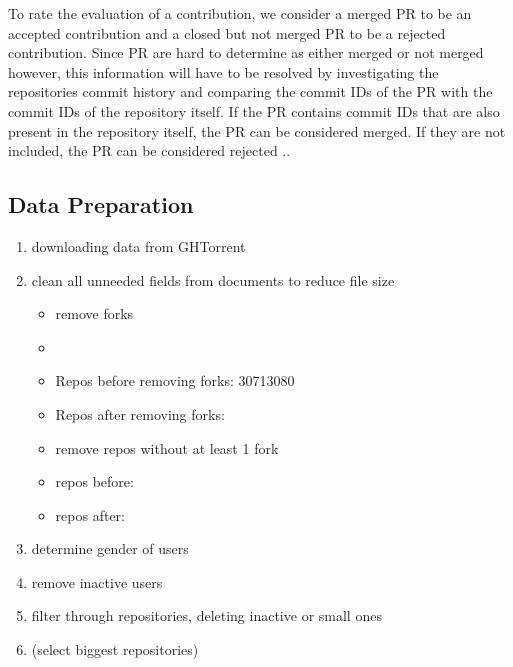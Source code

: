 To rate the evaluation of a contribution, we consider a merged \ac{PR} to be an accepted contribution and a closed but not merged \ac{PR} to be a rejected contribution. Since \ac{PR} are hard to determine as either merged or not merged however, this information will have to be resolved by investigating the repositories commit history and comparing the commit IDs of the \ac{PR} with the commit IDs of the repository itself. If the \ac{PR} contains commit IDs that are also present in the repository itself, the PR can be considered merged. If they are not included, the \ac{PR} can be considered rejected \cite{Vasilescu:2015:GTD:2702123.2702549}..



 \citeauthor{Tsay:2014:IST:2568225.2568315}

\subsection{Data Preparation}

\begin{enumerate}
	\item downloading data from GHTorrent
	\item clean all unneeded fields from documents to reduce file size
	\begin{itemize}
		\item remove forks \cite{Gousios:2014:ESP:2568225.2568260}
		\item
		\item Repos before removing forks: 30713080
		\item Repos after removing forks:
		\item remove repos without at least 1 fork
		\item repos before:
		\item repos after:
	\end{itemize}
	\item determine gender of users
	\item remove inactive users
	\item filter through repositories, deleting inactive or small ones \cite{Gousios:2014:ESP:2568225.2568260}
	\item (select biggest repositories)
\end{enumerate}


